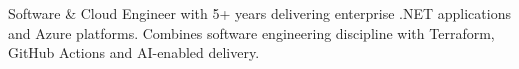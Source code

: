 Software \& Cloud Engineer with 5+ years delivering enterprise .NET applications and Azure platforms. Combines software engineering discipline with Terraform, GitHub Actions and AI-enabled delivery.
